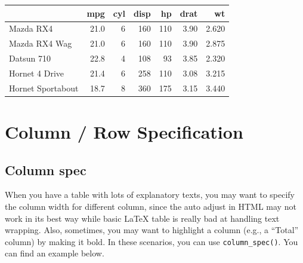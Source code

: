 \documentclass[table]{article}
\newenvironment{Shaded}{\begin{snugshade}}{\end{snugshade}}
\newcommand{\DataTypeTok}[1]{\textcolor[rgb]{0.13,0.29,0.53}{#1}}
\newcommand{\DecValTok}[1]{\textcolor[rgb]{0.00,0.00,0.81}{#1}}
\newcommand{\KeywordTok}[1]{\textcolor[rgb]{0.13,0.29,0.53}{\textbf{#1}}}
\newcommand{\NormalTok}[1]{#1}
\newcommand{\OperatorTok}[1]{\textcolor[rgb]{0.81,0.36,0.00}{\textbf{#1}}}
\newcommand{\StringTok}[1]{\textcolor[rgb]{0.31,0.60,0.02}{#1}}
\begin{document}
\begin{Shaded}
\end{Shaded}

\begin{table}[H]
\centering\begingroup\fontsize{7}{9}\selectfont

\begin{tabular}{lrrrrrr}
\toprule
  & mpg & cyl & disp & hp & drat & wt\\
\midrule
Mazda RX4 & 21.0 & 6 & 160 & 110 & 3.90 & 2.620\\
Mazda RX4 Wag & 21.0 & 6 & 160 & 110 & 3.90 & 2.875\\
Datsun 710 & 22.8 & 4 & 108 & 93 & 3.85 & 2.320\\
Hornet 4 Drive & 21.4 & 6 & 258 & 110 & 3.08 & 3.215\\
Hornet Sportabout & 18.7 & 8 & 360 & 175 & 3.15 & 3.440\\
\bottomrule
\end{tabular}
\endgroup{}
\end{table}

\hypertarget{column-row-specification}{%
\section{Column / Row Specification}\label{column-row-specification}}

\hypertarget{column-spec}{%
\subsection{Column spec}\label{column-spec}}

When you have a table with lots of explanatory texts, you may want to
specify the column width for different column, since the auto adjust in
HTML may not work in its best way while basic LaTeX table is really bad
at handling text wrapping. Also, sometimes, you may want to highlight a
column (e.g., a ``Total'' column) by making it bold. In these scenarios,
you can use \texttt{column\_spec()}. You can find an example below.
\end{document}
